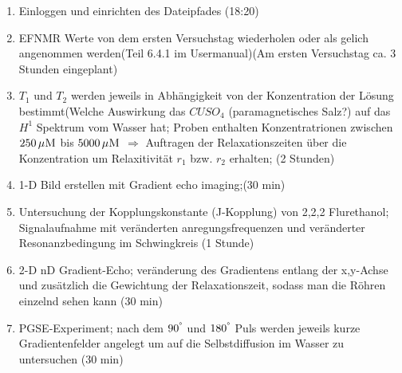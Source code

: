     \newpage
    \begin{enumerate}
        \item Einloggen und einrichten des Dateipfades (18:20)
        \item EFNMR Werte von dem ersten Versuchstag wiederholen oder als gelich angenommen werden(Teil 6.4.1 im Usermanual)(Am ersten Versuchstag ca. 3 Stunden eingeplant)
        \item $T_1$ und $T_2$ werden jeweils in Abhängigkeit von der Konzentration der Lösung bestimmt(Welche Auswirkung das $CUSO_4$ (paramagnetisches Salz?) auf das $H^1$ Spektrum vom Wasser hat; Proben enthalten  Konzentratrionen zwischen $\SI{250}{\mu \textsc{M}}$ bis $\SI{5000}{\mu \textsc{M}}$ $\Longrightarrow$ Auftragen der Relaxationszeiten über die Konzentration um Relaxitivität $r_1$ bzw. $r_2$ erhalten; (2 Stunden)
        \item 1-D Bild erstellen mit Gradient echo imaging;(30 min)
        \item Untersuchung der Kopplungskonstante (J-Kopplung) von 2,2,2 Flurethanol; Signalaufnahme mit veränderten anregungsfrequenzen und veränderter Resonanzbedingung im Schwingkreis (1 Stunde)
        \item 2-D nD Gradient-Echo; veränderung des Gradientens entlang der x,y-Achse und zusätzlich die Gewichtung der Relaxationszeit, sodass man die Röhren einzelnd sehen kann (30 min)
        \item PGSE-Experiment; nach dem $90^{\degree}$ und $180^{\degree}$ Puls werden jeweils kurze Gradientenfelder angelegt um auf die Selbstdiffusion im Wasser zu untersuchen (30 min)
        \end{enumerate}
